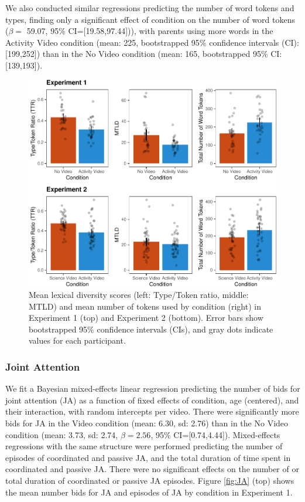 \documentclass[man,floatsintext]{apa6}
\begin{document}
We also conducted similar regressions predicting the number of word tokens and types, finding only a significant effect of condition on the number of word tokens (\(\beta=\) 59.07, 95\% CI={[}19.58,97.44{]})), with parents using more words in the Activity Video condition (mean: 225, bootstrapped 95\% confidence intervals (CI): {[}199,252{]}) than in the No Video condition (mean: 165, bootstrapped 95\% CI: {[}139,193{]}).

\begin{figure}[H]

{\centering \includegraphics{figs/fig-lexdiv-1} 

}

\caption{\label{fig:lexdiv} Mean lexical diversity scores (left: Type/Token ratio, middle: MTLD) and mean number of tokens used by condition (right) in Experiment 1 (top) and Experiment 2 (bottom). Error bars show bootstrapped 95\% confidence intervals (CIs), and gray dots indicate values for each participant.}\label{fig:fig-lexdiv}
\end{figure}

\hypertarget{joint-attention}{%
\subsubsection{Joint Attention}\label{joint-attention}}

We fit a Bayesian mixed-effects linear regression predicting the number of bids for joint attention (JA) as a function of fixed effects of condition, age (centered), and their interaction, with random intercepts per video.
There were significantly more bids for JA in the Video condition (mean: 6.30, sd: 2.76) than in the No Video condition (mean: 3.73, sd: 2.74, \(\beta=2.56\), 95\% CI={[}0.74,4.44{]}).
Mixed-effects regressions with the same structure were performed predicting the number of episodes of coordinated and passive JA, and the total duration of time spent in coordinated and passive JA.
There were no significant effects on the number of or total duration of coordinated or passive JA episodes.
Figure \ref{fig:JA} (top) shows the mean number bids for JA and episodes of JA by condition in Experiment 1.
\end{document}
